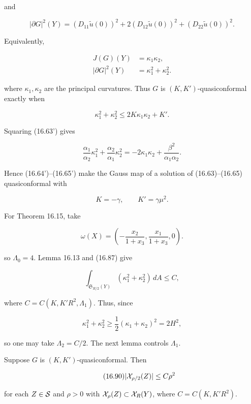 and

\[
|\partial G|^{2}(Y)=(D_{11}\tilde{u}(0))^{2}+2(D_{12}\tilde{u}(0))^{2}+(D_{22}\tilde{u}(0))^{2}.
\]

Equivalently,

\begin{equation}
\begin{aligned}
J(G)(Y)&=\kappa_{1}\kappa_{2},\\
|\partial G|^{2}(Y)&=\kappa_{1}^{2}+\kappa_{2}^{2}.
\end{aligned}
\tag{16.87}
\end{equation}

where $\kappa_1,\kappa_2$ are the principal curvatures.  Thus $G$ is
$(K,K')$-quasiconformal exactly when

\begin{equation}
\kappa_{1}^{2}+\kappa_{2}^{2}\leq 2K\kappa_{1}\kappa_{2}+K'.
\tag{16.88}
\end{equation}

Squaring (16.63') gives

\[
\frac{\alpha_{1}}{\alpha_{2}}\kappa_{1}^{2}+\frac{\alpha_{2}}{\alpha_{1}}\kappa_{2}^{2}=-2\kappa_{1}\kappa_{2}+\frac{\beta^{2}}{\alpha_{1}\alpha_{2}}.
\]

Hence (16.64')--(16.65') make the Gauss map of a solution of
(16.63)--(16.65) quasiconformal with

\begin{equation}
K=-\gamma,\qquad K'=\gamma\mu^{2}.
\tag{16.89}
\end{equation}

For Theorem 16.15, take

\[
\omega(X)=\left(-\frac{x_{2}}{1+x_{3}},\frac{x_{1}}{1+x_{3}},0\right).
\]

so $\Lambda_0=4$.  Lemma 16.13 and (16.87) give

\[
\int_{\mathfrak{S}_{R/2}(Y)}(\kappa_{1}^{2}+\kappa_{2}^{2})\,dA\leq C,
\]





where $C = C(K, K'R^2, \Lambda_1)$. Thus, since

\[
\kappa_1^2+\kappa_2^2 \geq \frac12(\kappa_1+\kappa_2)^2 = 2H^2,
\]

so one may take $\Lambda_2=C/2$.  The next lemma controls $\Lambda_1$.

\begin{lemma}\label{gilbarg-trudinger.lem.16.16.area-growth}
Suppose $G$ is $(K,K')$-quasiconformal. Then

\begin{equation}
\tag{16.90}
|\mathcal{X}_{\rho/2}(Z)| \leq C\rho^2
\end{equation}

for each $Z\in\mathcal{S}$ and $\rho>0$ with $\mathcal{X}_\rho(Z)\subset\mathcal{X}_R(Y)$, where $C=C(K,K'R^2)$.
\end{lemma}

